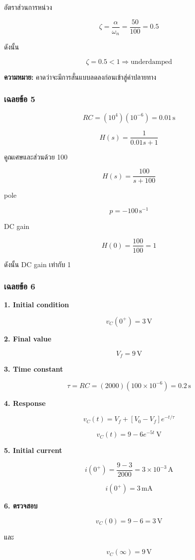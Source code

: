อัตราส่วนการหน่วง

\[
\zeta=\frac{\alpha}{\omega_n}=\frac{50}{100}=0.5
\]

ดังนั้น

\[
\boxed{\zeta=0.5<1\Rightarrow \text{underdamped}}
\]

\textbf{ความหมาย:} คาดว่าจะมีการสั่นแบบลดลงก่อนเข้าสู่ค่าปลายทาง

\subsubsection{เฉลยข้อ 5}

\[
RC=(10^4)(10^{-6})=0.01\,\text{s}
\]

\[
H(s)=\frac{1}{0.01s+1}
\]

คูณเศษและส่วนด้วย 100

\[
\boxed{H(s)=\frac{100}{s+100}}
\]

pole

\[
\boxed{p=-100\,\text{s}^{-1}}
\]

DC gain

\[
H(0)=\frac{100}{100}=1
\]

ดังนั้น DC gain เท่ากับ 1

\subsubsection{เฉลยข้อ 6}

\textbf{1. Initial condition}

\[
v_C(0^+)=3\,\text{V}
\]

\textbf{2. Final value}

\[
V_f=9\,\text{V}
\]

\textbf{3. Time constant}

\[
\tau=RC=(2000)(100\times10^{-6})=0.2\,\text{s}
\]

\textbf{4. Response}

\[
v_C(t)=V_f+[V_0-V_f]e^{-t/\tau}
\]

\[
\boxed{v_C(t)=9-6e^{-5t}\ \text{V}}
\]

\textbf{5. Initial current}

\[
i(0^+)=\frac{9-3}{2000}=3\times10^{-3}\,\text{A}
\]

\[
\boxed{i(0^+)=3\,\text{mA}}
\]

\textbf{6. ตรวจสอบ}

\[
v_C(0)=9-6=3\,\text{V}
\]

และ

\[
v_C(\infty)=9\,\text{V}
\]

